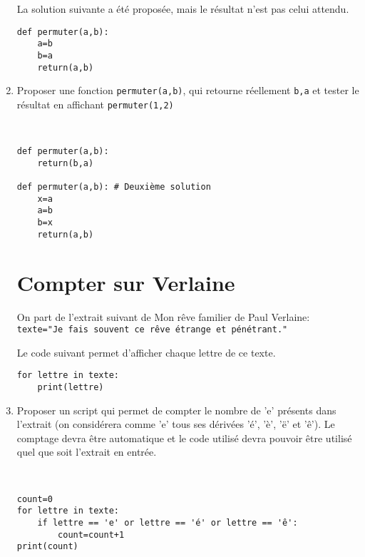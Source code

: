 \begin{enumerate}
La solution suivante a été proposée, mais le résultat n'est pas celui attendu.

\begin{verbatim}
def permuter(a,b):
    a=b
    b=a
    return(a,b)
\end{verbatim}

\item Proposer une fonction \verb?permuter(a,b)?, qui retourne réellement \verb?b,a? et tester le résultat en affichant \verb?permuter(1,2)?

\begin{solution}~\ \\
\begin{verbatim}
def permuter(a,b):
    return(b,a)
    
def permuter(a,b): # Deuxième solution
    x=a
    a=b
    b=x
    return(a,b)
\end{verbatim}
\end{solution}

\section*{Compter sur Verlaine}

On part de l'extrait suivant de \og Mon rêve familier \fg de Paul Verlaine:\\
 \verb?texte="Je fais souvent ce rêve étrange et pénétrant."?

Le code suivant permet d'afficher chaque lettre de ce texte.
\begin{verbatim}
for lettre in texte:
    print(lettre)
\end{verbatim}

\item Proposer un script qui permet de compter le nombre de 'e' présents dans l'extrait (on considérera comme 'e' tous ses dérivées 'é', 'è', 'ë' et 'ê'). Le comptage devra être automatique et le code utilisé devra pouvoir être utilisé quel que soit l'extrait en entrée.

\begin{solution}~\ \\
\begin{verbatim}
count=0
for lettre in texte:
    if lettre == 'e' or lettre == 'é' or lettre == 'ê':
        count=count+1
print(count)
\end{verbatim}
\end{solution}

\end{enumerate}

